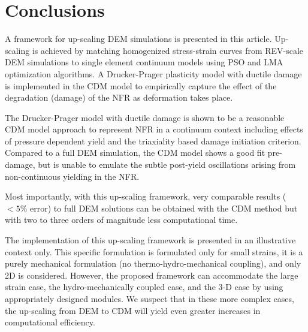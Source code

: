 \section{Conclusions}
A framework for up-scaling DEM simulations is presented in this article. Up-scaling is achieved by matching homogenized stress-strain curves from REV-scale DEM simulations to single element continuum models using PSO and LMA optimization algorithms. A Drucker-Prager plasticity model with ductile damage is implemented in the CDM model to empirically capture the effect of the degradation (damage) of the NFR as deformation takes place.

The Drucker-Prager model with ductile damage is shown to be a reasonable CDM model approach to represent NFR in a continuum context including effects of pressure dependent yield and the triaxiality based damage initiation criterion. Compared to a full DEM simulation, the CDM model shows a good fit pre-damage, but is unable to emulate the subtle post-yield oscillations arising from non-continuous yielding in the NFR.

Most importantly, with this up-scaling framework, very comparable results ($<5\%$ error) to full DEM solutions can be obtained with the CDM method but with two to three orders of magnitude less computational time.

The implementation of this up-scaling framework is presented in an illustrative context only. This specific formulation is formulated only for small strains, it is a purely mechanical formulation (no thermo-hydro-mechanical coupling), and only 2D is considered. However, the proposed framework can accommodate the large strain case, the hydro-mechanically coupled case, and the 3-D case by using appropriately designed modules. We suspect that in these more complex cases, the up-scaling from DEM to CDM will yield even greater increases in computational efficiency. 











\clearpage